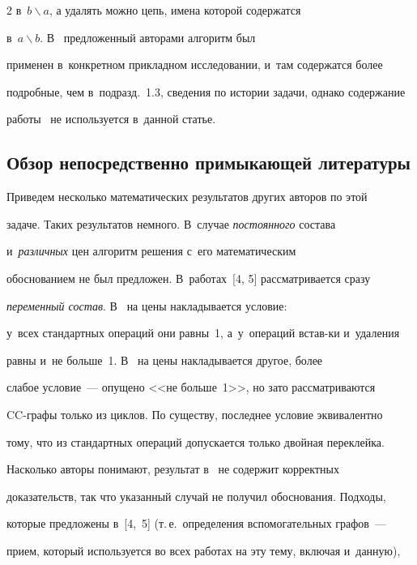 \begin{multicols}{2}
в~$b\backslash a$, а удалять можно цепь, имена которой содержатся 


в~$a\backslash b$. В~\cite{3-gor} предложенный авторами алгоритм был 


применен в~конкретном прикладном исследовании, и~там содержатся более 


подробные, чем в~подразд.~1.3, сведения по истории задачи, однако содержание 


работы~\cite{3-gor} не используется в~данной статье.


  


  \subsection{Обзор непосредственно примыкающей литературы}


  


  Приведем несколько математических результатов других авторов по этой 


задаче. Таких результатов немного. В~случае \textit{постоянного} состава 


и~\textit{различных} цен алгоритм решения с~его математическим 


обосно\-ва\-ни\-ем не был предложен. В~работах~[4, 5] рассматривается сразу 


\textit{переменный состав}. В~\cite{4-gor} на цены накладывается условие: 


у~всех стандартных операций они равны~1, а~у~операций встав-\linebreak ки и~удаления 


равны и~не больше~1. В~\cite{5-gor} на цены накладывается другое, более 


слабое условие~--- опущено <<не больше~1>>, но зато рассматриваются  


CC-гра\-фы только из циклов. По существу, последнее условие эквивалентно 


тому, что из стандартных операций допускается только двойная переклейка. 


Насколько авторы понимают, результат в~\cite{4-gor} не содержит корректных 


доказательств, так что указанный случай не получил обоснования. Подходы, 


которые предложены в~[4,~5] (т.\,е.\ определения вспомогательных графов~--- 


прием, который используется во всех работах на эту тему, включая и~данную), 



\end{multicols}
